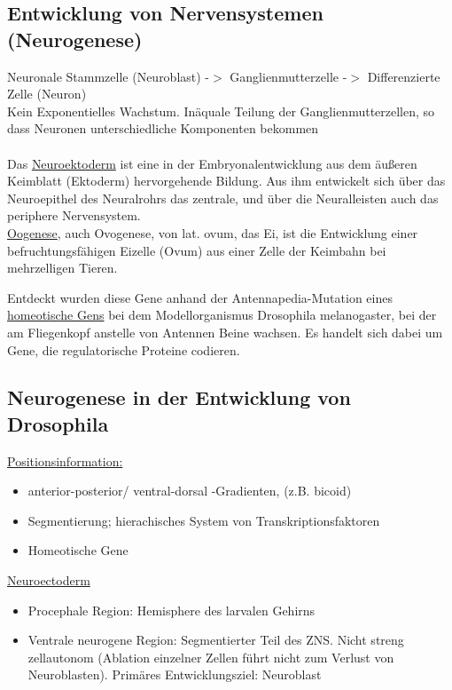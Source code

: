 \documentclass[12pt,a4paper]{article}
\begin{document}
\subsection{Entwicklung von Nervensystemen (Neurogenese)}
Neuronale Stammzelle (Neuroblast) -$>$ Ganglienmutterzelle -$>$ Differenzierte Zelle (Neuron)\\
Kein Exponentielles Wachstum. Inäquale Teilung der Ganglienmutterzellen, so dass Neuronen unterschiedliche Komponenten bekommen\\
\\
Das \underline{Neuroektoderm} ist eine in der Embryonalentwicklung aus dem äußeren Keimblatt (Ektoderm) hervorgehende Bildung. Aus ihm entwickelt sich über das Neuroepithel des Neuralrohrs das zentrale, und über die Neuralleisten auch das periphere Nervensystem.\\

\underline{Oogenese}, auch Ovogenese, von lat. ovum, das Ei, ist die Entwicklung einer befruchtungsfähigen Eizelle (Ovum) aus einer Zelle der Keimbahn bei mehrzelligen Tieren.

Entdeckt wurden diese Gene anhand der Antennapedia-Mutation eines \underline{homeotische Gens} bei dem Modellorganismus Drosophila melanogaster, bei der am Fliegenkopf anstelle von Antennen Beine wachsen. Es handelt sich dabei um Gene, die regulatorische Proteine codieren.

\subsection{Neurogenese in der Entwicklung von Drosophila}
\underline{Positionsinformation:}
\begin{itemize}
	\item anterior-posterior/ ventral-dorsal -Gradienten, (z.B. bicoid)
	\item Segmentierung; hierachisches System von Transkriptionsfaktoren
	\item Homeotische Gene
\end{itemize}

\underline{Neuroectoderm}
\begin{itemize}
	\item Procephale Region: Hemisphere des larvalen Gehirns
	\item Ventrale neurogene Region: Segmentierter Teil des ZNS. Nicht streng zellautonom (Ablation einzelner Zellen führt nicht zum Verlust von Neuroblasten). Primäres Entwicklungsziel: Neuroblast
\end{itemize}
\end{document}

